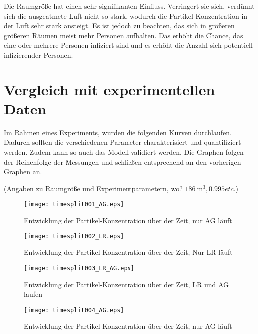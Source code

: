 \documentclass[12pt,a4paper,bibtotocnumbered,liststotocnumbered]{scrreprt}
\begin{document}
Die Raumgröße hat einen sehr signifikanten Einfluss. Verringert sie sich, verdünnt sich die ausgeatmete Luft nicht so stark, wodurch die Partikel-Konzentration in der Luft sehr stark ansteigt. Es ist jedoch zu beachten, das sich in größeren größeren Räumen meist mehr Personen aufhalten. Das erhöht die Chance, das eine oder mehrere Personen infiziert sind und es erhöht die Anzahl sich potentiell infizierender Personen.


\section{Vergleich mit experimentellen Daten}
Im Rahmen eines Experiments, wurden die folgenden Kurven durchlaufen. Dadurch sollten die verschiedenen Parameter charakterisiert und quantifiziert werden. Zudem kann so auch das Modell validiert werden. Die Graphen folgen der Reihenfolge der Messungen und schließen entsprechend an den vorherigen Graphen an.

(Angaben zu Raumgröße und Experimentparametern, wo? $\SI{186}{\cubic\meter}, 0.995 etc. $)

\begin{figure}[H]
\begin{minipage}[t]{0.49\textwidth}
\texttt{[image: timesplit001\_AG.eps]}
\caption{Entwicklung der Partikel-Konzentration über der Zeit, nur \acs{AG} läuft}
\label{Abb: timesplit001_AG}
\end{minipage}
\begin{minipage}[t]{0.49\textwidth}
\texttt{[image: timesplit002\_LR.eps]}
\caption{Entwicklung der Partikel-Konzentration über der Zeit, Nur \ac{LR} läuft}
\label{Abb: timesplit002_LR}
\end{minipage}
\begin{minipage}[t]{0.49\textwidth}
\texttt{[image: timesplit003\_LR\_AG.eps]}
\caption{Entwicklung der Partikel-Konzentration über der Zeit, LR und \acs{AG} laufen}
\label{Abb: timesplit003_LR_AG}
\end{minipage}
\begin{minipage}[t]{0.49\textwidth}
\texttt{[image: timesplit004\_AG.eps]}
\caption{Entwicklung der Partikel-Konzentration über der Zeit, nur \acs{AG} läuft}
\label{Abb: timesplit004_AG}
\end{minipage}
\end{figure}
\end{document}

